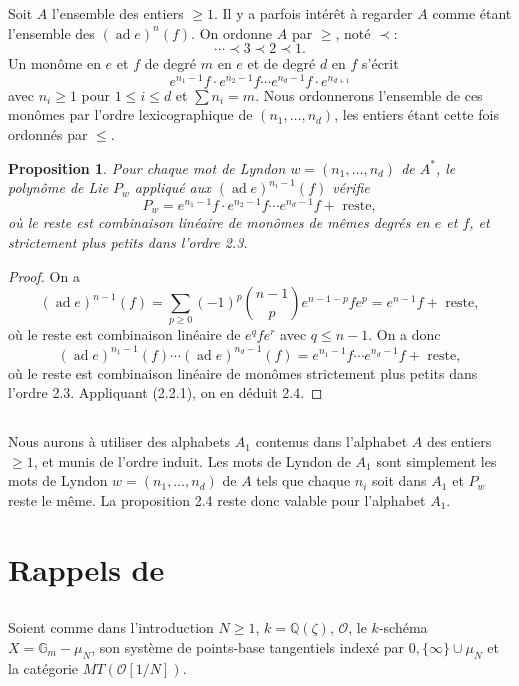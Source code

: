 \documentclass[11pt,a4paper]{article}
\theoremstyle{plain}
\newtheorem{proposition}[theorem]{Proposition}
\theoremstyle{definition}
\DeclareMathOperator{\ad}{ad}
\newcommand{\Gm}{\mathbb{G}_m}
\newcommand{\Q}{\mathbb{Q}}
\begin{document}
Soit $A$ l'ensemble des entiers $\geq 1$. Il y a parfois int\'er\^et \`a regarder $A$ comme \'etant l'ensemble des $(\ad e)^n(f)$. On ordonne $A$ par $\geq$, not\'e $\prec$:
\[
\cdots \prec 3 \prec 2 \prec 1.
\]
Un mon\^ome en $e$ et $f$ de degr\'e $m$ en $e$ et de degr\'e $d$ en $f$ s'\'ecrit
\[
e^{n_1-1}f \cdot e^{n_2-1}f \cdots e^{n_d-1}f \cdot e^{n_{d+1}}
\]
avec $n_i \geq 1$ pour $1 \leq i \leq d$ et $\sum n_i = m$. Nous ordonnerons l'ensemble de ces mon\^omes par l'ordre lexicographique de $(n_1,\ldots,n_d)$, les entiers \'etant cette fois ordonn\'es par $\leq$.

\begin{proposition}\label{prop:2.4}
Pour chaque mot de Lyndon $w = (n_1,\ldots,n_d)$ de $A^{\ast}$, le polyn\^ome de Lie $P_w$ appliqu\'e aux $(\ad e)^{n_i-1}(f)$ v\'erifie
\[
P_w = e^{n_1-1}f \cdot e^{n_2-1}f \cdots e^{n_d-1}f + \text{ reste},
\]
o\`u le reste est combinaison lin\'eaire de mon\^omes de m\^emes degr\'es en $e$ et $f$, et strictement plus petits dans l'ordre 2.3.
\end{proposition}

\begin{proof}
On a
\[
(\ad e)^{n-1}(f) = \sum_{p \geq 0} (-1)^p \binom{n-1}{p} e^{n-1-p}fe^p = e^{n-1}f + \text{ reste},
\]
o\`u le reste est combinaison lin\'eaire de $e^qfe^r$ avec $q \leq n-1$. On a donc
\[
(\ad e)^{n_1-1}(f) \cdots (\ad e)^{n_d-1}(f) = e^{n_1-1}f \cdots e^{n_d-1}f + \text{ reste},
\]
o\`u le reste est combinaison lin\'eaire de mon\^omes strictement plus petits dans l'ordre 2.3. Appliquant (2.2.1), on en d\'eduit 2.4.
\end{proof}

\subsection{}
Nous aurons \`a utiliser des alphabets $A_1$ contenus dans l'alphabet $A$ des entiers $\geq 1$, et munis de l'ordre induit. Les mots de Lyndon de $A_1$ sont simplement les mots de Lyndon $w = (n_1,\ldots,n_d)$ de $A$ tels que chaque $n_i$ soit dans $A_1$ et $P_w$ reste le m\^eme. La proposition 2.4 reste donc valable pour l'alphabet $A_1$.

\section{Rappels de \cite{1}}
\label{sec:3}

\subsection{}
Soient comme dans l'introduction $N \geq 1$, $k = \Q(\zeta)$, $\mathcal{O}$, le $k$-sch\'ema $X = \Gm - \mu_N$, son syst\`eme de points-base tangentiels index\'e par $0, \{\infty\} \cup \mu_N$ et la cat\'egorie $MT(\mathcal{O}[1/N])$.
\end{document}
